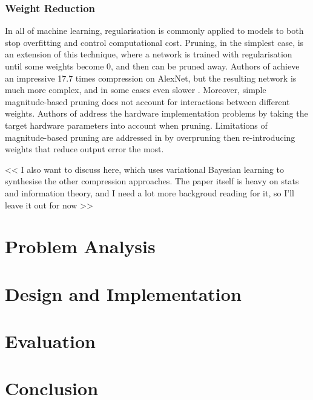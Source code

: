 \documentclass[12pt]{article}
\begin{document}
\subsubsection{Weight Reduction}
In all of machine learning, regularisation is commonly applied to models to both stop overfitting
and control computational cost.
Pruning, in the simplest case, is an extension of this technique, where a network is trained
with regularisation until some weights become 0, and then can be pruned away.
Authors of \cite{guo2016dynamic} achieve an impressive 17.7 times compression on AlexNet,
but the resulting network is much more complex, and in some cases even slower \cite{yu2017scalpel}.
Moreover, simple magnitude-based pruning does not account for interactions between different
weights.
Authors of \cite{yu2017scalpel} address the hardware implementation problems by taking the
target hardware parameters into account when pruning.
Limitations of magnitude-based pruning are addressed in \cite{yang2017designing} by overpruning
then re-introducing weights that reduce output error the most.

<< I also want to discuss \cite{ullrich2017soft} here, which uses variational Bayesian learning
to synthesise the other compression approaches.
The paper itself is heavy on stats and information theory, and I need a lot more backgroud
reading for it, so I'll leave it out for now >>
\section{Problem Analysis}

\section{Design and Implementation}

\section{Evaluation}

\section{Conclusion}


\end{document}
